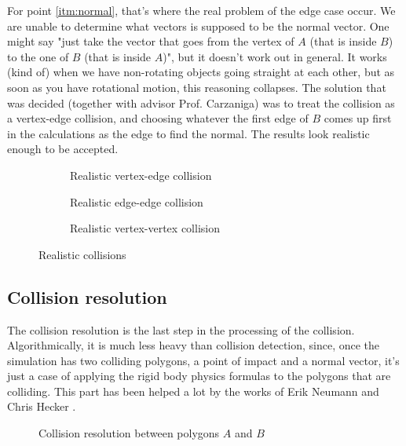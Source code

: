 For point \ref{itm:normal}, that's where the real problem of the edge case
occur. We are unable to determine what vectors is supposed to be the normal
vector. One might say "just take the vector that goes from the vertex of $A$
(that is inside $B$) to the one of $B$ (that is inside $A$)", but it doesn't
work out in general. It works (kind of) when we have non-rotating objects going
straight at each other, but as soon as you have rotational motion, this
reasoning collapses. The solution that was decided (together with advisor Prof.
Carzaniga) was to treat the collision as a vertex-edge collision, and choosing
whatever the first edge of $B$ comes up first in the calculations as the edge to
find the normal. The results look realistic enough to be accepted.


\begin{figure}[H]
	\centering
	\begin{subfigure}[]{.33\textwidth}
		\centering
		\caption{Realistic vertex-edge collision}
	\end{subfigure}
	\begin{subfigure}[]{.32\textwidth}
		\centering
		\caption{Realistic edge-edge collision}
	\end{subfigure}
	\begin{subfigure}[]{.34\textwidth}
		\centering
		\caption{Realistic vertex-vertex collision}
		\label{fig:real-vertex-vertex}
	\end{subfigure}
	\caption{Realistic collisions}
	\label{fig:real-collisions}
\end{figure}

\subsection{Collision resolution}
\label{sub:resolution}

The collision resolution is the last step in the processing of the collision.
Algorithmically, it is much less heavy than collision detection, since, once the
simulation has two colliding polygons, a point of impact and a normal vector,
it's just a case of applying the rigid body physics formulas to the polygons
that are colliding. This part has been helped a lot by the works of Erik Neumann
\cite{collision:resolution-site} and Chris Hecker
\cite{collision:resolution-paper}.

\begin{figure}[H]
	\centering
	\caption{Collision resolution between polygons $A$ and $B$}
	\label{fig:collision_resolution}
\end{figure}

